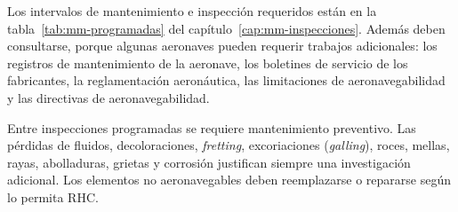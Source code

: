 Los intervalos de mantenimiento e inspección requeridos están en la tabla~\ref{tab:mm-programadas} del capítulo~\ref{cap:mm-inspecciones}. Además deben consultarse, porque algunas aeronaves pueden requerir trabajos adicionales: los registros de mantenimiento de la aeronave, los boletines de servicio de los fabricantes, la reglamentación aeronáutica, las limitaciones de aeronavegabilidad y las directivas de aeronavegabilidad.

Entre inspecciones programadas se requiere mantenimiento preventivo. Las pérdidas de fluidos, decoloraciones, \emph{fretting}, excoriaciones (\emph{galling}), roces, mellas, rayas, abolladuras, grietas y corrosión justifican siempre una investigación adicional. Los elementos no aeronavegables deben reemplazarse o repararse según lo permita RHC.
